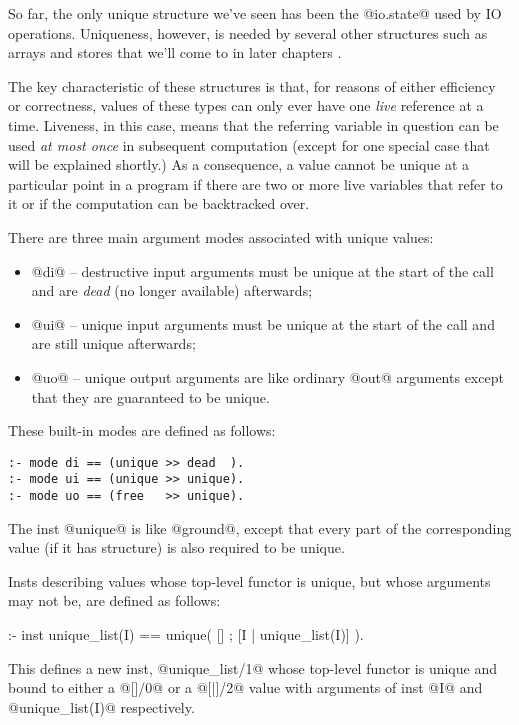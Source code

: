 So far, the only unique structure we've seen has been the @io.state@ used by
IO operations.  Uniqueness, however, is needed by several other structures
such as arrays and stores that we'll come to in later chapters \XXX{}.

The key characteristic of these structures is that, for reasons of either
efficiency or correctness, values of these types can only ever have one
\emph{live} reference at a time.  Liveness, in this case, means that the
referring variable in question can be used \emph{at most once} in subsequent
computation (except for one special case that will be explained shortly.) As
a consequence, a value cannot be unique at a particular point in a program
if there are two or more live variables that refer to it or if the
computation can be backtracked over.

There are three main argument modes associated with unique values:
\begin{itemize}
\item @di@ -- destructive input arguments must be unique at the start of the
call and are \emph{dead} (\ie no longer available) afterwards;
\item @ui@ -- unique input arguments must be unique at the start of the call
and are still unique afterwards;
\item @uo@ -- unique output arguments are like ordinary @out@ arguments
except that they are guaranteed to be unique.
\end{itemize}

These built-in modes are defined as follows:
\begin{verbatim}
:- mode di == (unique >> dead  ).
:- mode ui == (unique >> unique).
:- mode uo == (free   >> unique).
\end{verbatim}

The inst @unique@ is like @ground@, except that every part of the
corresponding value (if it has structure) is also required to be unique.

Insts describing values whose top-level functor is unique, but whose
arguments may not be, are defined as follows:
\begin{myverbatim}
:- inst unique_list(I) == unique( [] ; [I | unique_list(I)] ).
\end{myverbatim}
This defines a new inst, @unique_list/1@ whose top-level functor is unique
and bound to either a @[]/0@ or a @[|]/2@ value with arguments of inst @I@
and @unique_list(I)@ respectively.


